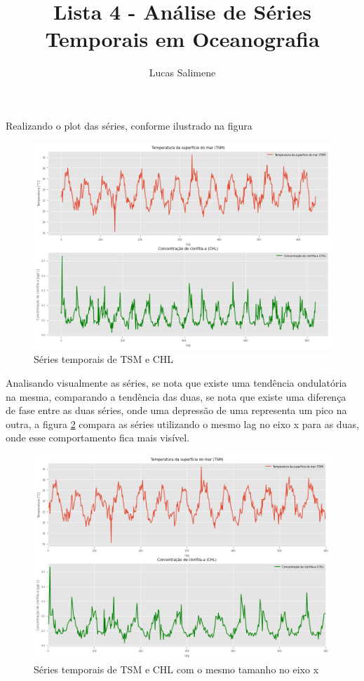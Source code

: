 \documentclass[12pt,a4paper,portuguese]{article}
\title{Lista 4 - Análise de Séries Temporais em Oceanografia}
\author{Lucas Salimene}
\date{}
\begin{document}
		\maketitle
	\newpage
	Realizando o plot das séries, conforme ilustrado na figura
	
	
	
\begin{figure}[H]
	\centering
	\includegraphics[width=1\linewidth]{lista4-2b]}
	\caption{Séries temporais de TSM e CHL}
	\label{fig:lista4-2b}
\end{figure}
	Analisando visualmente as séries, se nota que existe uma tendência ondulatória na mesma, comparando a tendência das duas, se nota que existe uma diferença de fase entre as duas séries, onde uma depressão de uma representa um pico na outra, a figura \ref{fig:lista4-2c} compara as séries utilizando o mesmo lag no eixo x para as duas, onde esse comportamento fica mais visível.
	
\begin{figure}[H]
	\centering
	\includegraphics[width=1\linewidth]{lista4-2c}
	\caption{Séries temporais de TSM e CHL com o mesmo tamanho no eixo x}
	\label{fig:lista4-2c}
\end{figure}
\end{document}
